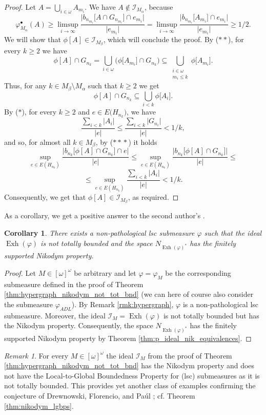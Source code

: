 \documentclass[a4paper,11pt,fleqn]{amsart}
\newtheorem{corollary}[theorem]{Corollary}
\theoremstyle{definition}
\theoremstyle{remark}
\newtheorem{remark}[theorem]{Remark}
\numberwithin{equation}{section}
\newcommand{\N}{\mathbb{N}}
\newcommand{\iI}{\mathcal{I}}
\DeclareMathOperator{\exh}{Exh}
\newcommand{\sm}{\setminus}
\newcommand{\sub}{\subseteq}
\newcommand{\ctblsub}[1]{\left[#1\right]^\omega}
\newcommand{\io}{\in\omega}%
\newcommand{\cso}{\ctblsub{\omega}}%
\begin{document}
\begin{proof}
Let $A=\bigcup_{i\io} A_{m_i}$. We have $A\notin\iI_{M_\alpha}$, because%
\[\varphi_{M_\alpha}^\bullet(A)\ge\limsup_{i\to\infty}\frac{\Big|b_{n_{m_i}}\Big[A\cap G_{n_{m_i}}\Big]\cap e_{m_i}\Big|}{\big|e_{m_i}\big|}=\limsup_{i\to\infty}\frac{\Big|b_{n_{m_i}}\big[A_{m_i}\big]\cap e_{m_i}\Big|}{\big|e_{m_i}\big|}\geq 1/2.\] 
We will show that $\phi[A]\in\iI_{M_\beta}$, which will conclude the proof. By ($**$), for every $k\geq 2$ we have
\[\phi[A]\cap G_{n_k}=\bigcup_{i\io}\big(\phi\big[A_{m_i}\big]\cap G_{n_k}\big) \sub \bigcup_{\substack{i\io\\m_i\leq k}} \phi\big[A_{m_i}\big].\]
Thus, for any $k\in M_\beta\sm M_\alpha$ such that $k\geq 2$ we get
\[\tag{$*\!*\!*$}\phi[A]\cap G_{n_k} \sub \bigcup_{i<k} \phi\big[A_i\big].\]
By ($*$), for every $k\ge2$ and $e\in E\big(H_{n_k}\big)$, we have 
\[\frac{\sum_{i<k}\big|A_i\big|}{|e|}\le\frac{\sum_{i<k}\big|G_{n_i}\big|}{|e|} < 1/k,\]
and so, for almost all $k\in M_\beta$, by ($*\!*\!*$) it holds
\[\sup_{e\in E(H_{n_k})}\frac{\Big|b_{n_k}\big[\phi[A]\cap G_{n_k}\big]\cap e\Big|}{|e|}\le\sup_{e\in E(H_{n_k})}\frac{\Big|b_{n_k}\big[\phi[A]\cap G_{n_k}\big]\Big|}{|e|}\le\]
\[\le\sup_{e\in E(H_{n_k})}\frac{\sum_{i<k}\big|A_i\big|}{|e|}<1/k.\]
Consequently, we get that $\phi[A]\in\iI_{M_\beta}$, as required.
\end{proof}

As a corollary, we get a positive answer to the second author's \cite[Question 9.1]{Zuc25}.

\begin{corollary}\label{cor:nikodym_not_tot_bnd}
There exists a non-pathological lsc submeasure $\varphi$ such that the ideal $\exh(\varphi)$ is not totally bounded and the space $N_{\exh(\varphi)^*}$ has the finitely supported Nikodym property.
\end{corollary}
\begin{proof}
 Let $M\in\cso$ be arbitrary and let $\varphi=\varphi_M$ be the corresponding submeasure defined in the proof of Theorem \ref{thm:hypergraph_nikodym_not_tot_bnd} (we can here of course also consider the submeasure $\varphi_{ADL}$). By Remark \ref{rmk:hypergraph}, $\varphi$ is a non-pathological lsc submeasure. Moreover, the ideal $\iI_M=\exh(\varphi)$ is not totally bounded but has the Nikodym property. Consequently, the space $N_{\exh(\varphi)^*}$ has the finitely supported Nikodym property by Theorem \ref{thm:p_ideal_nik_equivalences}.
\end{proof}

\begin{remark}\label{rmk:nikodym_submeas}
For every $M\in\cso$ the ideal $\iI_M$ from the proof of Theorem \ref{thm:hypergraph_nikodym_not_tot_bnd} has the Nikodym property and does not have the Local-to-Global Boundedness Property for (lsc) submeasures as it is not totally bounded. This provides yet another class of examples confirming the conjecture of Drewnowski, Florencio, and Pa\'ul \cite[Conjecture, page 147]{DFP96}; cf. Theorem \ref{thm:nikodym_lgbps}.
\end{remark}
\end{document}
